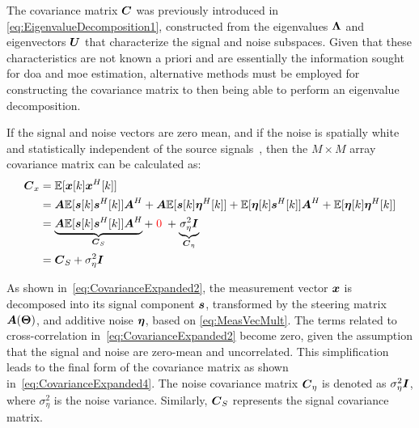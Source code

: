 The covariance matrix \( \boldsymbol{C} \) was previously introduced in \autoref{eq:EigenvalueDecomposition1}, constructed
from the eigenvalues \( \boldsymbol{\Lambda} \) and eigenvectors \( \boldsymbol{U} \) that characterize the signal and noise
subspaces. Given that these characteristics are not known a priori and are essentially the information sought for
\gls{doa} and \gls{moe} estimation, alternative methods must be employed for constructing the covariance matrix to
then being able to perform an eigenvalue decomposition.

If the signal and noise vectors are zero mean, and if the noise is spatially white and statistically independent of the
source signals~\cite{tuncer.ch5}, then the \( M \times M \) array covariance matrix can be calculated as:
\begin{align}
    \boldsymbol{C}_x & = \mathbb{E}[\boldsymbol{x}[k] \boldsymbol{x}^H[k]]  \label{eq:CovarianceExpanded1}                                                                                                                                                                   \\
              & = \boldsymbol{A} \mathbb{E}[\boldsymbol{s}[k] \boldsymbol{s}^H[k]] \boldsymbol{A}^H + \boldsymbol{A} \mathbb{E}[\boldsymbol{s}[k] \boldsymbol{\eta}^H[k]] + \mathbb{E}[\boldsymbol{\eta}[k] \boldsymbol{s}^H[k]] \boldsymbol{A}^H + \mathbb{E}[\boldsymbol{\eta}[k] \boldsymbol{\eta}^H[k]]  \label{eq:CovarianceExpanded2} \\
              & = \underbrace{\boldsymbol{A} \mathbb{E}[\boldsymbol{s}[k] \boldsymbol{s}^H[k]] \boldsymbol{A}^H}_{\boldsymbol{C}_S} + \; {\color{red}{0}} \; + \underbrace{\sigma_\eta^2 \boldsymbol{I}}_{\boldsymbol{C}_\eta} \label{eq:CovarianceExpanded3}                                                 \\
              & = \boldsymbol{C}_S + \sigma_\eta^2 \boldsymbol{I}  \label{eq:CovarianceExpanded4}
\end{align}\cite[Chapter 4]{meyer}

As shown in~\eqref{eq:CovarianceExpanded2}, the measurement vector \( \boldsymbol{x} \) is decomposed into its signal component
\( \boldsymbol{s} \), transformed by the steering matrix \( \boldsymbol{A}(\boldsymbol{\Theta}) \), and additive noise \( \boldsymbol{\eta} \),
based on \autoref{eq:MeasVecMult}.
The terms related to cross-correlation in~\eqref{eq:CovarianceExpanded2} become zero, given the assumption that the
signal and noise are zero-mean and uncorrelated. This simplification leads to the final form of the covariance matrix
as shown in~\eqref{eq:CovarianceExpanded4}.
The noise covariance matrix \( \boldsymbol{C}_\eta \) is denoted as \(\sigma_\eta^2 \boldsymbol{I}\), where \(\sigma_\eta^2\) is the noise variance. Similarly,
\( \boldsymbol{C}_S \) represents the signal covariance matrix.


